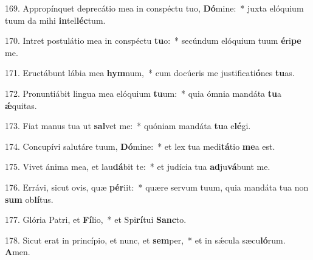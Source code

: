 169. Appropínquet deprecátio mea in conspéctu tuo, \textbf{Dó}mine:~*  juxta elóquium tuum da mihi \textbf{in}tel\textbf{léc}tum.\

170. Intret postulátio mea in conspéctu \textbf{tu}o:~*  secúndum elóquium tuum \textbf{é}ri\textbf{pe} me.\

171. Eructábunt lábia mea \textbf{hym}num,~*  cum docúeris me justificati\textbf{ó}nes \textbf{tu}as.\

172. Pronuntiábit lingua mea elóquium \textbf{tu}um:~*  quia ómnia mandáta \textbf{tu}a \textbf{ǽ}quitas.\

173. Fiat manus tua ut \textbf{sal}vet me:~*  quóniam mandáta \textbf{tu}a e\textbf{lé}gi.\

174. Concupívi salutáre tuum, \textbf{Dó}mine:~*  et lex tua medi\textbf{tá}tio \textbf{me}a est.\

175. Vivet ánima mea, et lau\textbf{dá}bit te:~*  et judícia tua \textbf{ad}ju\textbf{vá}bunt me.\

176. Errávi, sicut ovis, quæ \textbf{pér}iit:~*  quære servum tuum, quia mandáta tua non \textbf{sum} ob\textbf{lí}tus.\

177. Glória Patri, et \textbf{Fí}lio,~*  et Spi\textbf{rí}tui \textbf{Sanc}to.\

178. Sicut erat in princípio, et nunc, et \textbf{sem}per,~*  et in sǽcula sæcu\textbf{ló}rum. \textbf{A}men.\

